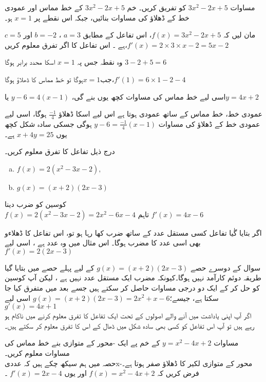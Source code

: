 
مساوات \( 3x^{2}-2x+5\) کو تفریق کریں۔
خم \( 3x^{2}-2x+5\) کے خط مماس اور عمودی خط کے ڈھلاؤ کی مساوات بنائیں، جبکہ اس نقطے پر \(x=1\) ہو۔

مان لیں کہ \(f(x)=3x^{2}-2x+5\)، اس تفاعل کے مطابق    \(  a=3      \)       ،    \(   b=-2     \)       اور    \(  c=5     \) 
ہے ۔ اس تفاعل کا اگر تفرق معلوم کریں،\( f\prime(x) =2\times3\times x-2 = 5x-2\)

وہ نقطہ جس پہ \( x=1    \) اسکا  محدد برابر ہوگا  \(  3-2+5=6  \)

جب\(   x=1 \)ہوگا تو خط مماس کا ڈھلاؤ ہوگا،\(f\prime (1)=6\times 1-2-4\)

اسی لیے خط مماس کی مساوات کچھ یوں بنے گی،         \( y-6=4(x-1)\)    یا\(y=4x+2\)

عمودی خط، خط مماس کے ساتھ عمودی ہوتا ہے اس لیے اسکا ڈھلاؤ   \( \frac{-1}{4}\)  ہوگا، اسی لیے عمودی خط کے ڈھلاؤ کی مساوات      \(y-6=\frac{-1}{4}(x-1)\)  ہوگی جسکی سادہ شکل کچھ یوں \(x+4y=25\) ہے۔


درج ذیل تفاعل کا تفرق معلوم کریں۔
\begin{enumerate}[a.]
\item $f(x)=2(x^{2}-3x-2),$
\item  $  g(x)=(x+2)(2x-3)$
\end{enumerate}
کوسین کو ضرب دینا\\
$f(x)=2(x^2-3x-2)=2x^2-6x-4$
تاہم \(  f'(x)=4x-6     \)\\

اگر بتایا گٰیا تفاعل کسی مستقل عدد کے ساتھ ضرب کھا رہا ہو تو، اس تفاعل کا ڈھلاءو بھی اسی عدد کا مضرب ہوگا۔ اس مثال میں وہ عدد  ہے ، اسی لیے $f'(x)=2(2x-3)$

سوال کے دوسرے حصے $g(x)=(x+2)(2x-3)$ کے لیے پہلے حصے میں بتایا گیا طریقہ دوئم کارآمد نہیں ہوگا۔کیونکہ مضرب ایک مستقل عدد نہیں ہے ، لیکن آپ کوسین کو حل کر کے ایک دو درجی مساوات حاصل کر سکتے ہیں جسے بعد میں متفرق کیا جا سکتا ہے، جیسے؛$g(x)=(x+2)(2x-3)=2x^2+x-6 $ اسی لیے  $g\prime(x)=4x+1 $\\
اگر آپ اپنی یاداشت میں آنے والے اصولوں کے تحت ایک تفاعل کا تفرق معلوم کرنے میں ناکام ہو رہے ہیں تو آپ اس تفاعل کو کسی بھی سادہ شکل میں ڈھال کے اس کا تفرق معلوم کر سکتے ہیں۔

مساوات $y=x^2-4x+2 $ کے خم پے ایک -محور کے متوازی بنے خط مماس کی مساوات معلوم کریں۔\\
حصہ   میں ہم سیکھ چکے ہیں کہ  عددی{x}-محور کے متوازی لکیر کا ڈھلاؤ صفر ہوتا ہے۔ فرض کریں کہ  $f(x)=x^2-4x+2 $ اور یوں   $f'(x)=2x-4 $ ۔

